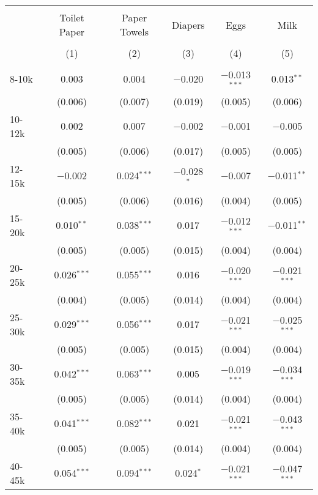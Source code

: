 
\begin{table}[!htbp] \centering 
  \caption{} 
  \label{} 
\begin{tabular}{@{\extracolsep{5pt}}lccccc} 
\\[-1.8ex]\hline 
\hline \\[-1.8ex] 
 & Toilet Paper & Paper Towels & Diapers & Eggs & Milk \\ 
\\[-1.8ex] & (1) & (2) & (3) & (4) & (5)\\ 
\hline \\[-1.8ex] 
 8-10k & 0.003 & 0.004 & $-$0.020 & $-$0.013$^{***}$ & 0.013$^{**}$ \\ 
  & (0.006) & (0.007) & (0.019) & (0.005) & (0.006) \\ 
  10-12k & 0.002 & 0.007 & $-$0.002 & $-$0.001 & $-$0.005 \\ 
  & (0.005) & (0.006) & (0.017) & (0.005) & (0.005) \\ 
  12-15k & $-$0.002 & 0.024$^{***}$ & $-$0.028$^{*}$ & $-$0.007 & $-$0.011$^{**}$ \\ 
  & (0.005) & (0.006) & (0.016) & (0.004) & (0.005) \\ 
  15-20k & 0.010$^{**}$ & 0.038$^{***}$ & 0.017 & $-$0.012$^{***}$ & $-$0.011$^{**}$ \\ 
  & (0.005) & (0.005) & (0.015) & (0.004) & (0.004) \\ 
  20-25k & 0.026$^{***}$ & 0.055$^{***}$ & 0.016 & $-$0.020$^{***}$ & $-$0.021$^{***}$ \\ 
  & (0.004) & (0.005) & (0.014) & (0.004) & (0.004) \\ 
  25-30k & 0.029$^{***}$ & 0.056$^{***}$ & 0.017 & $-$0.021$^{***}$ & $-$0.025$^{***}$ \\ 
  & (0.005) & (0.005) & (0.015) & (0.004) & (0.004) \\ 
  30-35k & 0.042$^{***}$ & 0.063$^{***}$ & 0.005 & $-$0.019$^{***}$ & $-$0.034$^{***}$ \\ 
  & (0.005) & (0.005) & (0.014) & (0.004) & (0.004) \\ 
  35-40k & 0.041$^{***}$ & 0.082$^{***}$ & 0.021 & $-$0.021$^{***}$ & $-$0.043$^{***}$ \\ 
  & (0.005) & (0.005) & (0.014) & (0.004) & (0.004) \\ 
  40-45k & 0.054$^{***}$ & 0.094$^{***}$ & 0.024$^{*}$ & $-$0.021$^{***}$ & $-$0.047$^{***}$ \\ 

\end{tabular}
\end{table}
